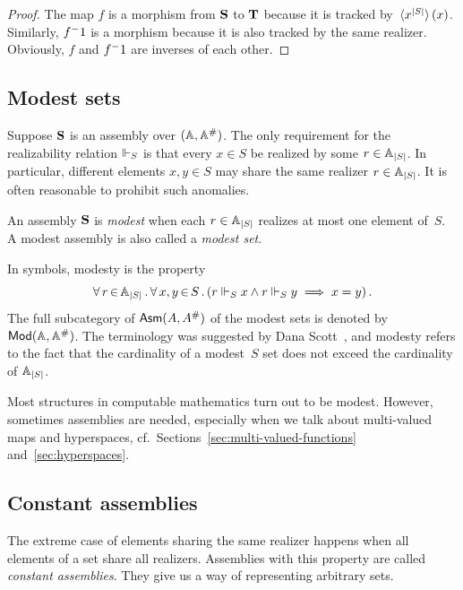 \begin{proof}
  The map $f$ is a morphism from $\mathbf{S}$ to $\mathbf{T}$ because it is
  tracked by~$\langle x^{|S|} \rangle\,(x)$. Similarly, ${f}^-1$ is a
  morphism because it is also tracked by the same realizer. Obviously,
  $f$ and ${f}^-1$ are inverses of each other.
\end{proof}


\subsection{Modest sets}
\label{sec:modest-sets}

Suppose $\mathbf{S}$ is an assembly over $(\mathbb{A}, \mathbb{A}^{\#})$. The only
requirement for the realizability relation $\Vdash_S$ is that every $x
\in S$ be realized by some $r \in \mathbb{A}_{|S|}$. In particular, different
elements $x, y \in S$ may share the same realizer $r \in \mathbb{A}_{|S|}$.
It is often reasonable to prohibit such anomalies.

\begin{definition}
  An assembly $\mathbf{S}$ is \emph{modest} when each $r \in \mathbb{A}_{|S|}$
  realizes at most one element of~$S$. A modest assembly is also
  called a \emph{modest set}.
\end{definition}

\noindent
In symbols, modesty is the property
%
\begin{equation*}
  \forall\, r \,{\in}\, \mathbb{A}_{|S|}\,.\,
    \forall\, x,y \,{\in}\, S\,.\left(
      r \Vdash_S x \land r \Vdash_S y \implies x = y
    \right)
 .
\end{equation*}
%
The full subcategory of $\mathsf{Asm}(A,A^{\#})$ of the modest sets is
denoted by~$\mathsf{Mod}(\mathbb{A}, \mathbb{A}^{\#})$. The terminology was suggested by Dana
Scott~\cite{Scott:modest-sets}, and modesty refers to the fact that
the cardinality of a modest~$S$ set does not exceed the cardinality of
$\mathbb{A}_{|S|}$.

Most structures in computable mathematics turn out to be modest.
However, sometimes assemblies are needed, especially when we talk
about multi-valued maps and hyperspaces,
cf.~Sections~\ref{sec:multi-valued-functions}
and~\ref{sec:hyperspaces}.


\subsection{Constant assemblies}
\label{sec:nabla}

The extreme case of elements sharing the same realizer happens when
all elements of a set share all realizers. Assemblies with this
property are called \emph{constant assemblies}. They give us a way of
representing arbitrary sets.

